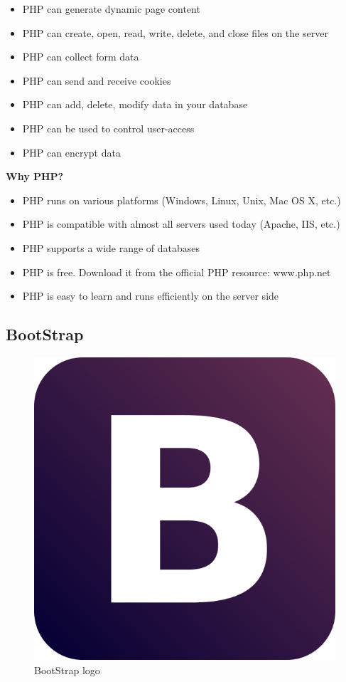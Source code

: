   \begin{itemize}
    \item PHP can generate dynamic page content
    \item PHP can create, open, read, write, delete, and close files on the server
     \item PHP can collect form data
     \item PHP can send and receive cookies
    \item  PHP can add, delete, modify data in your database
    \item PHP can be used to control user-access
     \item PHP can encrypt data\\
\end{itemize}
  {\bf Why PHP?}
 \begin{itemize}
 \item   PHP runs on various platforms (Windows, Linux, Unix, Mac OS X, etc.)
 \item   PHP is compatible with almost all servers used today (Apache, IIS, etc.)
\item    PHP supports a wide range of databases
 \item   PHP is free. Download it from the official PHP resource: www.php.net
 \item   PHP is easy to learn and runs efficiently on the server side
\end{itemize}


\subsection{BootStrap} 
\begin{figure}[h]
\centering \includegraphics[scale=0.2]{input/images/boot.png}
\caption{BootStrap logo}
\end{figure}

